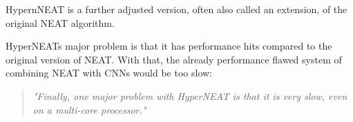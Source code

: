 HypernNEAT is a further adjusted version, often also called an extension, of the original NEAT algorithm.\cite{Lowell2011}

HyperNEATs major problem is that it has performance hits compared to the original version of NEAT.
With that, the already performance flawed system of combining NEAT with CNNs would be too slow:

\begin{quote}
	\emph{"Finally, one major problem with HyperNEAT is that it is very slow, even on a multi-core processor."}\cite{Lowell2011}	
\end{quote}